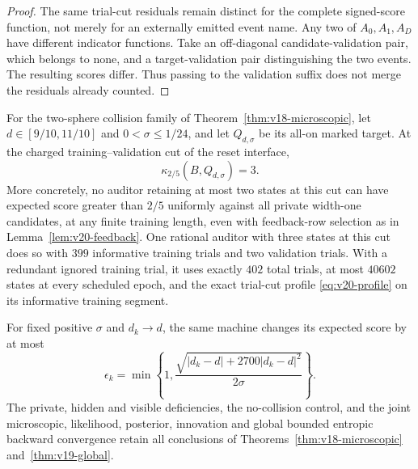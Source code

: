 \begin{proof}
The same trial-cut residuals remain distinct for the complete signed-score
function, not merely for an externally emitted event name. Any two of
$A_0,A_1,A_D$ have different indicator functions. Take an off-diagonal
candidate-validation pair, which belongs to none, and a target-validation
pair distinguishing the two events. The resulting scores differ. Thus
passing to the validation suffix does not merge the residuals already
counted.
\end{proof}

\begin{theorem}
\label{thm:v20-physical}
For the two-sphere collision family of
Theorem~\ref{thm:v18-microscopic}, let $d\in[9/10,11/10]$ and
$0<\sigma\le1/24$, and let $Q_{d,\sigma}$ be its all-on marked target.
At the charged training--validation cut of the reset interface,
\begin{equation}\label{eq:v20-kappa}
 \kappa_{2/5}(B,Q_{d,\sigma})=3.
\end{equation}
More concretely, no auditor retaining at most two states at this cut can
have expected score greater than $2/5$ uniformly against all private
width-one candidates, at any finite training length, even with feedback-row selection as in
Lemma~\ref{lem:v20-feedback}. One rational auditor
with three states at this cut does so with $399$ informative training
trials and two validation trials. With a redundant ignored training trial,
it uses exactly $402$ total trials, at most $40602$ states at every
scheduled epoch, and the exact trial-cut profile
\eqref{eq:v20-profile} on its informative training segment.

For fixed positive $\sigma$ and $d_k\to d$, the same machine changes its
expected score by at most
\begin{equation}\label{eq:v20-transportscore}
 \epsilon_k=\min\left\{1,
 \frac{\sqrt{|d_k-d|+2700|d_k-d|^2}}{2\sigma}\right\}.
\end{equation}
The private, hidden and visible deficiencies, the no-collision control,
and the joint microscopic, likelihood, posterior, innovation and global
bounded entropic backward convergence retain all conclusions of
Theorems~\ref{thm:v18-microscopic} and~\ref{thm:v19-global}.
\end{theorem}
